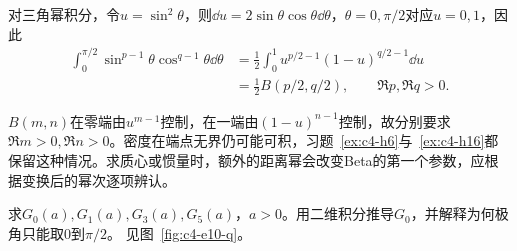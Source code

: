 对三角幂积分，令$u=\sin^2\theta$，则$\dd u=2\sin\theta\cos\theta\dd\theta$，$\theta=0,\pi/2$对应$u=0,1$，因此
\[\begin{aligned}
\int_0^{\pi/2}\sin^{p-1}\theta\cos^{q-1}\theta\dd\theta
&=\frac12\int_0^1u^{p/2-1}(1-u)^{q/2-1}\dd u\\
&=\frac12B(p/2,q/2),\qquad \Re p,\Re q>0.
\end{aligned}\]

$B(m,n)$在零端由$u^{m-1}$控制，在一端由$(1-u)^{n-1}$控制，故分别要求$\Re m>0,\Re n>0$。密度在端点无界仍可能可积，习题~\ref{ex:c4-h6}与~\ref{ex:c4-h16}都保留这种情况。求质心或惯量时，额外的距离幂会改变Beta的第一个参数，应根据变换后的幂次逐项辨认。

\begin{example}[高斯积分的角域与递推系数]\label{ex:c4-e10}
求$G_0(a),G_1(a),G_3(a),G_5(a)$，$a>0$。用二维积分推导$G_0$，并解释为何极角只能取$0$到$\pi/2$。 见图~\ref{fig:c4-e10-q}。
\end{example}

